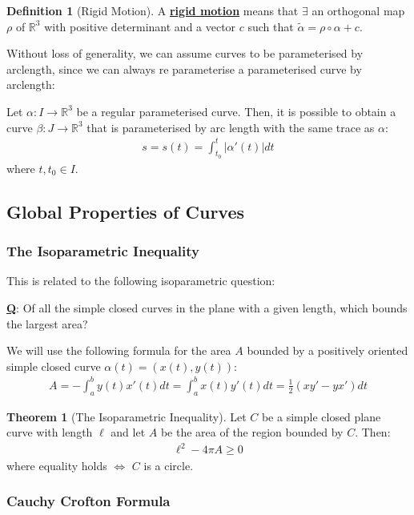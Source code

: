 \documentclass[11pt]{scrartcl}
\newcommand{\R}[0]{\mathbb{R}}
\theoremstyle{definition}
\newtheorem{theorem}{Theorem}
\newtheorem{definition}{Definition}
\theoremstyle{remark}
\newcommand{\dfn}[1]{\textbf{\underline{#1}}}
\newcommand{\idx}[2]{\int_{#1}^{#2}}
\begin{document}
{\begin{definition}[Rigid Motion]
	A \dfn{rigid motion} means that $\exists$ an orthogonal map $\rho$ of $\R^3$ with positive determinant and a vector $c$ such that $\widetilde{\alpha} = \rho \circ \alpha + c$. 
\end{definition}

Without loss of generality, we can assume curves to be parameterised by arclength, since we can always re parameterise a parameterised curve by arclength: 

Let $\alpha: I \rightarrow \R^3$ be a regular parameterised curve. Then, it is possible to obtain a curve $\beta: J \rightarrow \R^3$ that is parameterised by arc length with the same trace as $\alpha$: 
\begin{align*}
	s = s(t) = \idx{t_0}{t} | \alpha'(t) | dt
\end{align*}
where $t, t_0 \in I$. 

\subsection{Global Properties of Curves}

\subsubsection{The Isoparametric Inequality}
This is related to the following isoparametric question: 
\begin{center}
	\textbf{\underline{Q}}: Of all the simple closed curves in the plane with a given length, which bounds the largest area? 
\end{center}
We will use the following formula for the area $A$ bounded by a positively oriented simple closed curve $\alpha(t) = (x(t), y(t))$:
\begin{align*}
	A = - \idx{a}{b} y(t) x'(t) dt = \idx{a}{b} x(t)y'(t) dt = \frac{1}{2} (xy' - yx') dt 
\end{align*}

\begin{theorem}[The Isoparametric Inequality]
	Let $C$ be a simple closed plane curve with length $\ell$ and let $A$ be the area of the region bounded by $C$. Then: 
	\begin{align}
		\ell^2 - 4 \pi A \geq 0 	
	\end{align}
	where equality holds $\iff$ $C$ is a circle. 

\end{theorem}

\subsubsection{Cauchy Crofton Formula}

}
\end{document}

